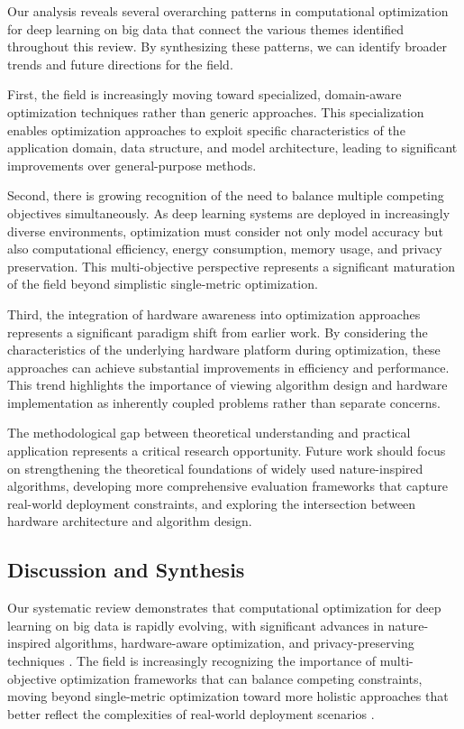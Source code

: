 Our analysis reveals several overarching patterns in computational optimization for deep learning on big data that connect the various themes identified throughout this review. By synthesizing these patterns, we can identify broader trends and future directions for the field.

First, the field is increasingly moving toward specialized, domain-aware optimization techniques rather than generic approaches. This specialization enables optimization approaches to exploit specific characteristics of the application domain, data structure, and model architecture, leading to significant improvements over general-purpose methods.

Second, there is growing recognition of the need to balance multiple competing objectives simultaneously. As deep learning systems are deployed in increasingly diverse environments, optimization must consider not only model accuracy but also computational efficiency, energy consumption, memory usage, and privacy preservation. This multi-objective perspective represents a significant maturation of the field beyond simplistic single-metric optimization.

Third, the integration of hardware awareness into optimization approaches represents a significant paradigm shift from earlier work. By considering the characteristics of the underlying hardware platform during optimization, these approaches can achieve substantial improvements in efficiency and performance. This trend highlights the importance of viewing algorithm design and hardware implementation as inherently coupled problems rather than separate concerns.

The methodological gap between theoretical understanding and practical application represents a critical research opportunity. Future work should focus on strengthening the theoretical foundations of widely used nature-inspired algorithms, developing more comprehensive evaluation frameworks that capture real-world deployment constraints, and exploring the intersection between hardware architecture and algorithm design.

\subsection{Discussion and Synthesis}
Our systematic review demonstrates that computational optimization for deep learning on big data is rapidly evolving, with significant advances in nature-inspired algorithms, hardware-aware optimization, and privacy-preserving techniques \citep{Eid20223845, Kim2022, Zhang20229876}. The field is increasingly recognizing the importance of multi-objective optimization frameworks that can balance competing constraints, moving beyond single-metric optimization toward more holistic approaches that better reflect the complexities of real-world deployment scenarios \citep{Deb2014}.

